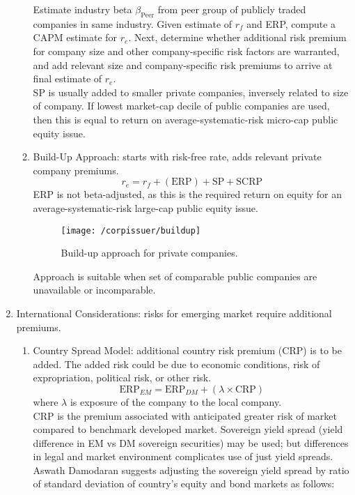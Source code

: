 \begin{method}
\begin{enumerate}[label=\roman*.]
\begin{enumerate}[label=\arabic*.]
Estimate industry beta $\beta_{\text{Peer}}$ from peer group of publicly traded companies in same industry. Given estimate of $r_f$ and ERP, compute a CAPM estimate for $r_e$. Next, determine whether additional risk premium for company size and other company-specific risk factors are warranted, and add relevant size and company-specific risk premiums to arrive at final estimate of $r_e$.\\
SP is usually added to smaller private companies, inversely related to size of company. If lowest market-cap decile of public companies are used, then this is equal to return on average-systematic-risk micro-cap public equity issue. 
\item Build-Up Approach: starts with risk-free rate, adds relevant private company premiums.
\begin{equation}
r_e = r_f + (\text{ERP}) + \text{SP} + \text{SCRP} \nonumber
\end{equation}
ERP is not beta-adjusted, as this is the required return on equity for an average-systematic-risk large-cap public equity issue. 
\begin{figure}[H]
\centering
\texttt{[image: /corpissuer/buildup]}
\caption{Build-up approach for private companies.}
\end{figure}
Approach is suitable when set of comparable public companies are unavailable or incomparable.
\end{enumerate}
\item International Considerations: risks for emerging market require additional premiums.
\begin{enumerate}[label=\arabic*.]
\setlength{\itemsep}{0pt}
\item Country Spread Model: additional country risk premium (CRP) is to be added. The added risk could be due to economic conditions, risk of expropriation, political risk, or other risk.
\begin{equation}
\text{ERP}_{EM} = \text{ERP}_{DM} + (\lambda \times \text{CRP}) \nonumber
\end{equation}
where $\lambda$ is exposure of the company to the local company.\\
CRP is the premium associated with anticipated greater risk of market compared to benchmark developed market. Sovereign yield spread (yield difference in EM vs DM sovereign securities) may be used; but differences in legal and market environment complicates use of just yield spreads.\\
Aswath Damodaran suggests adjusting the sovereign yield spread by ratio of standard deviation of country's equity and bond markets as follows:

\end{enumerate}
\end{enumerate}
\end{method}
